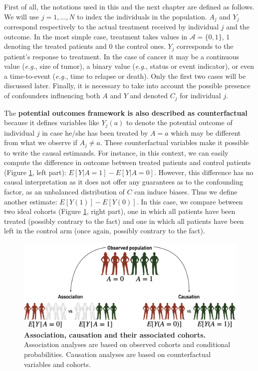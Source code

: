 \documentclass[a4paper,12pt,twoside,onecolumn,openright,final,oldfontcommands]{memoir}
\begin{document}
First of all, the notations used in this and the next chapter are
defined as follows. We will use \(j=1,...,N\) to index the individuals
in the population. \(A_j\) and \(Y_j\) correspond respectively to the
actual treatment received by individual \(j\) and the outcome. In the
most simple case, treatment takes values in \(\mathcal{A}=\{0, 1\}\),
\(1\) denoting the treated patients and \(0\) the control ones. \(Y_j\)
corresponds to the patient's response to treatment. In the case of
cancer it may be a continuous value (\emph{e.g.}, size of tumor), a
binary value (\emph{e.g.}, status or event indicator), or even a
time-to-event (\emph{e.g.}, time to relapse or death). Only the first
two cases will be discussed later. Finally, it is necessary to take into
account the possible presence of confounders influencing both \(A\) and
\(Y\) and denoted \(C_j\) for individual \(j\).

The \textbf{potential outcomes framework is also described as
counterfactual} because it defines variables like \(Y_j(a)\) to denote
the potential outcome of individual \(j\) in case he/she has been
treated by \(A=a\) which may be different from what we observe if
\(A_j\neq a\). These counterfactual variables make it possible to write
the causal estimands. For instance, in this context, we can easily
compute the difference in outcome between treated patients and control
patients (Figure \ref{fig:causality}, left part):
\(E[Y | A=1] - E[Y | A=0].\) However, this difference has no causal
interpretation as it does not offer any guarantees as to the confounding
factor, as an unbalanced distribution of \(C\) can induce biases. Thus
we define another estimate: \(E[Y(1)] - E[Y(0)].\) In this case, we
compare between two ideal cohorts (Figure \ref{fig:causality}, right
part), one in which all patients have been treated (possibly contrary to
the fact) and one in which all patients have been left in the control
arm (once again, possibly contrary to the fact).

\begin{figure}

{\centering \includegraphics[width=0.9\linewidth]{fig/causality} 

}

\caption[Association, causation and their associated cohorts]{\textbf{Association, causation and their
associated cohorts.} Association analyses are based on observed cohorts
and conditional probabilities. Causation analyses are based on
counterfactual variables and cohorts.}\label{fig:causality}
\end{figure}
\end{document}

